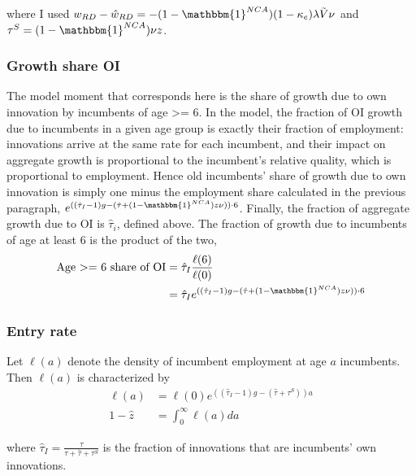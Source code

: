 \documentclass[11pt,english]{article}
\theoremstyle{definition}
\begin{document}
where I used $w_{RD} - \hat{w}_{RD} = -(1-\mathbbm{1}^{NCA})(1-\kappa_e) \lambda \tilde{V} \nu$ and $\tau^S = (1-\mathbbm{1}^{NCA})\nu z$. 

\subsubsection{Growth share OI}\label{appendix:calibration:growthShareOI}

The model moment that corresponds here is the share of growth due to own innovation by incumbents of age >= 6. In the model, the fraction of OI growth due to incumbents in a given age group is exactly their fraction of employment: innovations arrive at the same rate for each incumbent, and their impact on aggregate growth is proportional to the incumbent's relative quality, which is proportional to employment. Hence old incumbents' share of growth due to own innovation is simply one minus the employment share calculated in the previous paragraph, $e^{((\hat{\tau}_I -1)g - (\hat{\tau} + (1-\mathbbm{1}^{NCA})z \nu))\cdot 6}$. Finally, the fraction of aggregate growth due to OI is $\hat{\tau}_i$, defined above. The fraction of growth due to incumbents of age at least 6 is the product of the two, 
\begin{align*}
\textrm{Age >= 6 share of OI} &= \hat{\tau}_I \frac{\ell(6)}{\ell(0)} \\
&= \hat{\tau}_I e^{((\hat{\tau}_I -1)g - (\hat{\tau} + (1-\mathbbm{1}^{NCA})z \nu))\cdot 6} 
\end{align*}


\subsubsection{Entry rate}\label{appendix:calibration:entryRate}

Let $\ell(a)$ denote the density of incumbent employment at age $a$ incumbents. Then $\ell(a)$ is characterized by 
\begin{align*}
\ell(a) &= \ell(0)e^{((\hat{\tau}_I -1)g - (\hat{\tau} + \tau^S))a}  \\
1 - \hat{z} &= \int_0^{\infty} \ell(a) da
\end{align*}

where $\hat{\tau}_I = \frac{\tau}{\tau + \hat{\tau} + \tau^S}$ is the fraction of innovations that are incumbents' own innovations. 
\end{document}
